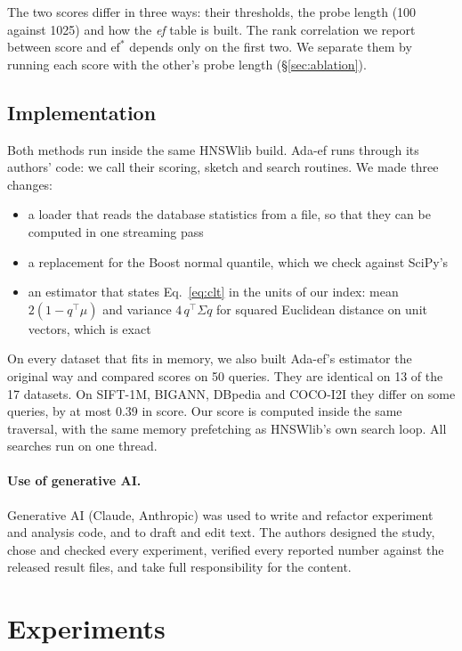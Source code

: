\documentclass[twocolumn]{svjour3}
\newcommand{\ef}{\textit{ef}}
\begin{document}
The two scores differ in three ways: their thresholds, the probe length (100 against 1025) and how
the \ef{} table is built. The rank correlation we report between score and $\mathrm{ef}^*$ depends
only on the first two. We separate them by running each score with the other's probe length
(\S\ref{sec:ablation}).

\subsection{Implementation}

Both methods run inside the same HNSWlib build. Ada-ef runs through its authors' code: we call their
scoring, sketch and search routines. We made three changes:
\begin{itemize}
\item a loader that reads the database statistics from a file, so that they can be computed in one
  streaming pass
\item a replacement for the Boost normal quantile, which we check against SciPy's
\item an estimator that states Eq.~\eqref{eq:clt} in the units of our index: mean
  $2(1 - q^\top\mu)$ and variance $4\,q^\top\Sigma q$ for squared Euclidean distance on unit vectors,
  which is exact
\end{itemize}
On every dataset that fits in memory, we also built Ada-ef's estimator the original way and compared
scores on 50 queries. They are identical on 13 of the 17 datasets. On SIFT-1M, BIGANN, DBpedia and
COCO-I2I they differ on some queries, by at most 0.39 in score. Our score is computed inside the same traversal, with the same
memory prefetching as HNSWlib's own search loop. All searches run on one thread.

\paragraph{Use of generative AI.}
Generative AI (Claude, Anthropic) was used to write and refactor experiment and analysis code,
and to draft and edit text. The authors designed the study, chose and checked every
experiment, verified every reported number against the released result files, and take
full responsibility for the content.

\section{Experiments}
\end{document}
